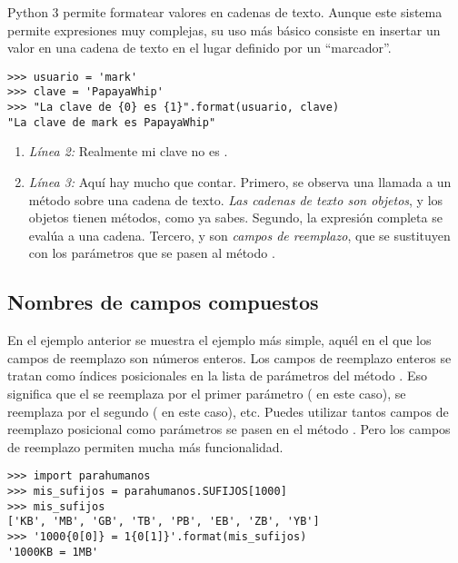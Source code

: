 Python 3 permite formatear valores en cadenas de texto. Aunque este sistema permite expresiones muy complejas, su uso más básico consiste en insertar un valor en una cadena de texto en el lugar definido por un ``marcador''.

\noindent\begin{minipage}{\textwidth}
\begin{lstlisting}[mathescape=True]
>>> usuario = 'mark'
>>> clave = 'PapayaWhip'
>>> "La clave de {0} es {1}".format(usuario, clave)
"La clave de mark es PapayaWhip"
\end{lstlisting}
\end{minipage}

\begin{enumerate}

\item \emph{Línea 2:} Realmente mi clave no es .

\item \emph{Línea 3:} Aquí hay mucho que contar. Primero, se observa una llamada a un método sobre una cadena de texto. \emph{Las cadenas de texto son objetos}, y los objetos tienen métodos, como ya sabes. Segundo, la expresión completa se evalúa a una cadena. Tercero,  y  son \emph{campos de reemplazo}, que se sustituyen con los parámetros que se pasen al método .

\end{enumerate}

\subsection{Nombres de campos compuestos}

En el ejemplo anterior se muestra el ejemplo más simple, aquél en el que los campos de reemplazo son números enteros. Los campos de reemplazo enteros se tratan como índices posicionales en la lista de parámetros del método . Eso significa que el  se reemplaza por el primer parámetro ( en este caso),  se reemplaza por el segundo ( en este caso), etc. Puedes utilizar tantos campos de reemplazo posicional como parámetros se pasen en el método . Pero los campos de reemplazo permiten mucha más funcionalidad.

\noindent\begin{minipage}{\textwidth}
\begin{lstlisting}[mathescape=True]
>>> import parahumanos
>>> mis_sufijos = parahumanos.SUFIJOS[1000]
>>> mis_sufijos
['KB', 'MB', 'GB', 'TB', 'PB', 'EB', 'ZB', 'YB']
>>> '1000{0[0]} = 1{0[1]}'.format(mis_sufijos)
'1000KB = 1MB'
\end{lstlisting}
\end{minipage}

